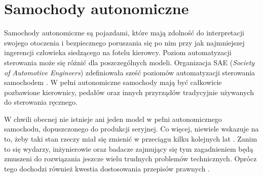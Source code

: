 \chapter{Samochody autonomiczne}
\vspace{-1cm}
Samochody autonomiczne są pojazdami, które mają zdolność do interpretacji swojego otoczenia i bezpiecznego poruszania się po nim przy jak najmniejszej ingerencji człowieka siedzącego na fotelu kierowcy. Poziom automatyzacji sterowania może się różnić dla poszczególnych modeli. Organizacja SAE (\textit{Society of Automotive Engineers}) zdefiniowała sześć poziomów automatyzacji sterowania samochodem \cite{synopsys:whatIsAutonomousCar}. W pełni autonomiczne samochody mają być całkowicie pozbawione kierownicy, pedałów oraz innych przyrządów tradycyjnie używanych do sterowania ręcznego.

W chwili obecnej nie istnieje ani jeden model w pełni autonomicznego samochodu, dopuszczonego do produkcji seryjnej. Co więcej, niewiele wskazuje na to, żeby taki stan rzeczy miał się zmienić w przeciągu kilku kolejnych lat \cite{adams:yearsAwaySDCs, houwelling:wontGetSdcSoon}. Zanim to się wydarzy, inżynierowie oraz badacze zajmujący się tym zagadnieniem będą zmuszeni do rozwiązania jeszcze wielu trudnych problemów technicznych. Oprócz tego dochodzi również kwestia dostosowania przepisów prawnych \cite{businessInsider:autonomiczneAutaPrawo}.

